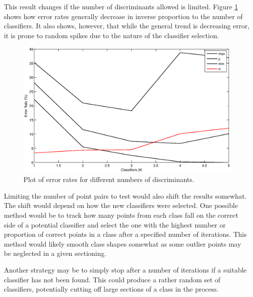 This result changes if the number of discriminants allowed is limited. Figure
\ref{fig:error_rates} shows how error rates generally decrease in inverse
proportion to the number of classifiers. It also shows, however, that while the
general trend is decreasing error, it is prone to random spikes due to the
nature of the classifier selection.

\begin{figure}
\label{fig:error_rates}
\includegraphics[scale=0.6]{sequence_error_plots}
\caption{Plot of error rates for different numbers of discriminants.}
\end{figure}

Limiting the number of point pairs to test would also shift the results
somewhat. The shift would depend on how the new classifiers were selected. One
possible method would be to track how many points from each class fall on the
correct side of a potential classifier and select the one with the highest
number or proportion of correct points in a class after a specified number of
iterations. This method would likely smooth class shapes somewhat as some
outlier points may be neglected in a given sectioning.

Another strategy may be to simply stop after a number of iterations if a
suitable classifier has not been found. This could produce a rather random set
of classifiers, potentially cutting off large sections of a class in the
process.